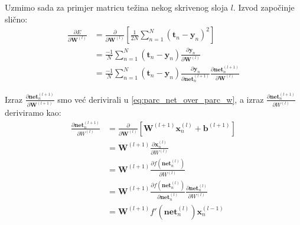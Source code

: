 \documentclass[times, utf8, diplomski, numeric]{fer}
\begin{document}
Uzmimo sada za primjer matricu težina nekog skrivenog sloja $l$. Izvod započinje slično:
\begin{equation} %
\label{eq:e_over_w_hidden_layer}
\begin{split}
  \frac{\partial E}{\partial \boldsymbol{W}^{(l)}}
    &= \frac{\partial}{\partial \boldsymbol{W}^{(l)}} \left[ \frac{1}{2N} \sum_{n=1}^{N} \left( \boldsymbol{t}_{n} - \boldsymbol{y}_{n} \right)^2 \right] \\
    &= \frac{-1}{N} \sum_{n=1}^{N} \left( \boldsymbol{t}_{n} - \boldsymbol{y}_{n} \right) \frac{\partial \boldsymbol{y}_n}{\partial \boldsymbol{W}^{(l)}} \\
    &= \frac{-1}{N} \sum_{n=1}^{N} \left( \boldsymbol{t}_{n} - \boldsymbol{y}_{n} \right) \frac{\partial \boldsymbol{y}_n}{\partial \boldsymbol{net}_n^{(l+1)}} \frac{\partial \boldsymbol{net}_n^{(l+1)}}{\partial \boldsymbol{W}^{(l)}}
\end{split}
\end{equation}

Izraz $\frac{\partial \boldsymbol{net}_n^{(l+1)}}{\partial \boldsymbol{W}^{(l+1)}}$ smo već derivirali u \ref{eq:parc_net_over_parc_w}, a izraz $\frac{\partial \boldsymbol{net}_n^{(l+1)}}{\partial W^{(l)}}$ deriviramo kao:
\begin{equation} %
\begin{split}
  \frac{\partial \boldsymbol{net}_n^{(l+1)}}{\partial W^{(l)}}
    &= \frac{\partial}{\partial \boldsymbol{W}^{(l)}} \left[ \boldsymbol{W}^{(l+1)} \boldsymbol{x}_n^{(l)} + \boldsymbol{b}^{(l+1)} \right] \\
    &= \boldsymbol{W}^{(l+1)} \frac{\partial \boldsymbol{x}_n^{(l)}}{\partial W^{(l)}} \\
    &= \boldsymbol{W}^{(l+1)} \frac{\partial f \left( \boldsymbol{net}_n^{(l)} \right) }{\partial W^{(l)}} \\
    &= \boldsymbol{W}^{(l+1)} \frac{\partial f \left( \boldsymbol{net}_n^{(l)} \right)}{\partial \boldsymbol{net}_n^{(l)}} \frac{\partial \boldsymbol{net}_n^{(l)}}{\partial W^{(l)}} \\
    &= \boldsymbol{W}^{(l+1)} f'\left(\boldsymbol{net}_n^{(l)}\right) \boldsymbol{x}_n^{(l-1)}
\end{split}
\end{equation}
\end{document}
